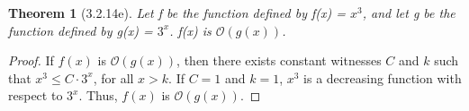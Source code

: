 \documentclass[a4paper, 12pt]{article}
\theoremstyle{plain}
\newtheorem*{theorem*}{Theorem}
\begin{document}
	
	\begin{theorem*}[3.2.14e]
		Let f be the function defined by f(x) = $x^{3}$, and let g be the function defined by g(x) = $3^{x}$. f(x) is $\mathcal{O}(g(x))$.
	\end{theorem*}
	
	\begin{proof}
		If $f(x)$ is $\mathcal{O}(g(x))$, then there exists constant witnesses $C$ and $k$ such that $x^{3} \le C \cdot 3^{x}$, for all $x > k$. If $C = 1$ and $k = 1$, $x^{3}$ is a decreasing function with respect to $3^{x}$. Thus, $f(x)$ is $\mathcal{O}(g(x))$.
	\end{proof}
\end{document}

